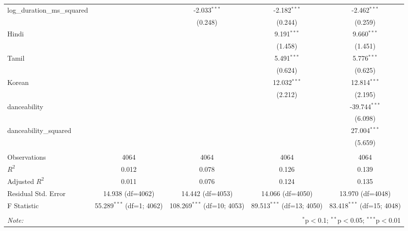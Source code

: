 \begin{table}[!htbp]
\begin{tabular}{@{\extracolsep{5pt}}lcccc}
 log_duration_ms_squared & & -2.033$^{***}$ & -2.182$^{***}$ & -2.462$^{***}$ \\
& & (0.248) & (0.244) & (0.259) \\
 Hindi & & & 9.191$^{***}$ & 9.660$^{***}$ \\
& & & (1.458) & (1.451) \\
 Tamil & & & 5.491$^{***}$ & 5.776$^{***}$ \\
& & & (0.624) & (0.625) \\
 Korean & & & 12.032$^{***}$ & 12.814$^{***}$ \\
& & & (2.212) & (2.195) \\
 danceability & & & & -39.744$^{***}$ \\
& & & & (6.098) \\
 danceability_squared & & & & 27.004$^{***}$ \\
& & & & (5.659) \\
\hline \\[-1.8ex]
 Observations & 4064 & 4064 & 4064 & 4064 \\
 $R^2$ & 0.012 & 0.078 & 0.126 & 0.139 \\
 Adjusted $R^2$ & 0.011 & 0.076 & 0.124 & 0.135 \\
 Residual Std. Error & 14.938 (df=4062) & 14.442 (df=4053) & 14.066 (df=4050) & 13.970 (df=4048) \\
 F Statistic & 55.289$^{***}$ (df=1; 4062) & 108.269$^{***}$ (df=10; 4053) & 89.513$^{***}$ (df=13; 4050) & 83.418$^{***}$ (df=15; 4048) \\
\hline
\hline \\[-1.8ex]
\textit{Note:} & \multicolumn{4}{r}{$^{*}$p$<$0.1; $^{**}$p$<$0.05; $^{***}$p$<$0.01} \\
\end{tabular}
\end{table}